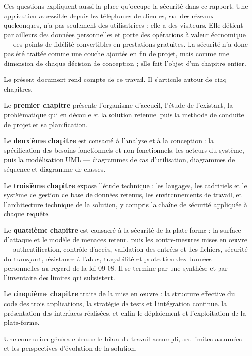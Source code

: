 Ces questions expliquent aussi la place qu'occupe la sécurité dans ce rapport.
Une application accessible depuis les téléphones de clientes, sur des réseaux
quelconques, n'a pas seulement des utilisatrices : elle a des visiteurs. Elle
détient par ailleurs des données personnelles et porte des opérations à valeur
économique --- des points de fidélité convertibles en prestations gratuites. La
sécurité n'a donc pas été traitée comme une couche ajoutée en fin de projet,
mais comme une dimension de chaque décision de conception ; elle fait l'objet
d'un chapitre entier.

Le présent document rend compte de ce travail. Il s'articule autour de cinq
chapitres.

Le \textbf{premier chapitre} présente l'organisme d'accueil, l'étude de
l'existant, la problématique qui en découle et la solution retenue, puis la
méthode de conduite de projet et sa planification.

Le \textbf{deuxième chapitre} est consacré à l'analyse et à la conception : la
spécification des besoins fonctionnels et non fonctionnels, les acteurs du
système, puis la modélisation UML --- diagrammes de cas d'utilisation,
diagrammes de séquence et diagramme de classes.

Le \textbf{troisième chapitre} expose l'étude technique : les langages, les
cadriciels et le système de gestion de base de données retenus, les
environnements de travail, et l'architecture technique de la solution, y
compris la chaîne de sécurité appliquée à chaque requête.

Le \textbf{quatrième chapitre} est consacré à la sécurité de la plate-forme :
la surface d'attaque et le modèle de menaces retenu, puis les contre-mesures
mises en \oe uvre --- authentification, contrôle d'accès, validation des
entrées et des fichiers, sécurité du transport, résistance à l'abus,
traçabilité et protection des données personnelles au regard de la loi 09-08.
Il se termine par une synthèse et par l'inventaire des limites qui subsistent.

Le \textbf{cinquième chapitre} traite de la mise en \oe uvre : la structure
effective du code des trois applications, la stratégie de tests et
l'intégration continue, la présentation des interfaces réalisées, et enfin le
déploiement et l'exploitation de la plate-forme.

Une conclusion générale dresse le bilan du travail accompli, ses limites
assumées et les perspectives d'évolution de la solution.
